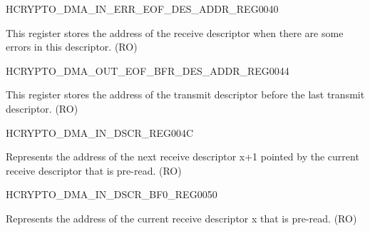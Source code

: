 \begin{register}{H}{CRYPTO\_DMA\_IN\_ERR\_EOF\_DES\_ADDR\_REG}{\hexprefix{}0040}\label{regdesc:CRYPTODMAINERREOFDESADDRREG}
%
\regnewline%
\begin{regdesc}\begin{reglist}
\label{fielddesc:CRYPTODMAINERREOFDESADDR}\item [CRYPTO\_DMA\_IN\_ERR\_EOF\_DES\_ADDR] This register stores the address of the receive descriptor when there are some errors in this descriptor. (RO)
\end{reglist}\end{regdesc}
\end{register}


\begin{register}{H}{CRYPTO\_DMA\_OUT\_EOF\_BFR\_DES\_ADDR\_REG}{\hexprefix{}0044}\label{regdesc:CRYPTODMAOUTEOFBFRDESADDRREG}
%
\regnewline%
\begin{regdesc}\begin{reglist}
\label{fielddesc:CRYPTODMAOUTEOFBFRDESADDR}\item [CRYPTO\_DMA\_OUT\_EOF\_BFR\_DES\_ADDR] This register stores the address of the transmit descriptor before the last transmit descriptor. (RO)
\end{reglist}\end{regdesc}
\end{register}


\begin{register}{H}{CRYPTO\_DMA\_IN\_DSCR\_REG}{\hexprefix{}004C}\label{regdesc:CRYPTODMAINDSCRREG}
%
\regnewline%
\begin{regdesc}\begin{reglist}
\label{fielddesc:CRYPTODMAINLINKDSCR}\item [CRYPTO\_DMA\_INLINK\_DSCR] Represents the address of the next receive descriptor x+1 pointed by the current receive descriptor that is pre-read. (RO)
\end{reglist}\end{regdesc}
\end{register}


\begin{register}{H}{CRYPTO\_DMA\_IN\_DSCR\_BF0\_REG}{\hexprefix{}0050}\label{regdesc:CRYPTODMAINDSCRBF0REG}
%
\regnewline%
\begin{regdesc}\begin{reglist}
\label{fielddesc:CRYPTODMAINLINKDSCRBF0}\item [CRYPTO\_DMA\_INLINK\_DSCR\_BF0] Represents the address of the current receive descriptor x that is pre-read. (RO)
\end{reglist}\end{regdesc}
\end{register}


